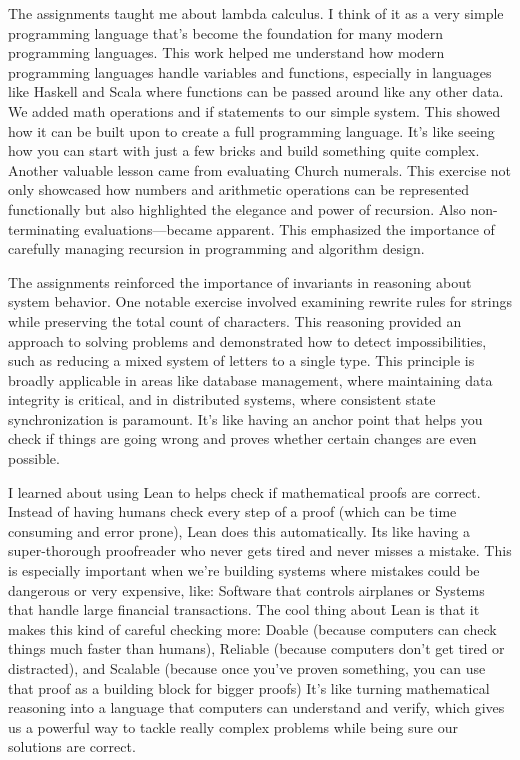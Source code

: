 \documentclass{article}
\theoremstyle{theorem}
\theoremstyle{definition}
\theoremstyle{remark}
\begin{document}
The assignments taught me about lambda calculus. I think of it as a very simple programming language 
that's become the foundation for many modern programming languages. This work helped me understand 
how modern programming languages handle variables and functions, especially in languages like Haskell 
and Scala where functions can be passed around like any other data. We added math operations and if 
statements to our simple system. This showed how it can be built upon to create a full programming 
language. It's like seeing how you can start with just a few bricks and build something quite complex. 
Another valuable lesson came from evaluating Church numerals. This exercise not only showcased how 
numbers and arithmetic operations can be represented functionally but also highlighted the elegance 
and power of recursion. Also non-terminating evaluations—became apparent. This emphasized the 
importance of carefully managing recursion in programming and algorithm design.

The assignments reinforced the importance of invariants in reasoning about system behavior. One notable 
exercise involved examining rewrite rules for strings while preserving the total count of characters. 
This reasoning provided an approach to solving problems and demonstrated how to detect impossibilities, 
such as reducing a mixed system of letters to a single type. This principle is broadly applicable in 
areas like database management, where maintaining data integrity is critical, and in distributed systems,
where consistent state synchronization is paramount. It's like having an anchor point that helps you check 
if things are going wrong and proves whether certain changes are even possible.

I learned about using Lean to helps check if mathematical proofs are correct. 
Instead of having humans check every step of a proof (which can be time consuming and error prone), 
Lean does this automatically. Its like having a super-thorough proofreader who never gets tired and 
never misses a mistake. This is especially important when we're building systems where mistakes could be 
dangerous or very expensive, like: Software that controls airplanes or Systems that handle large financial transactions.
The cool thing about Lean is that it makes this kind of careful checking more: Doable (because computers can check 
things much faster than humans), Reliable (because computers don't get tired or distracted), and Scalable (because once 
you've proven something, you can use that proof as a building block for bigger proofs) It's like turning mathematical 
reasoning into a language that computers can understand and verify, which gives us a powerful way to tackle really 
complex problems while being sure our solutions are correct.
\end{document}
